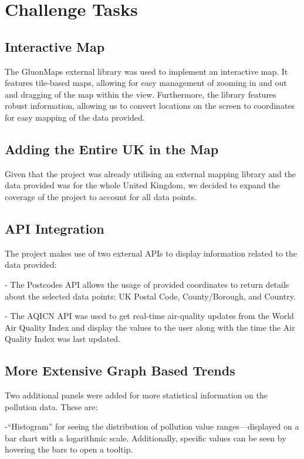 \documentclass[../main.tex]{subfiles}
\begin{document}
\section{Challenge Tasks}

\subsection{Interactive Map}
The GluonMaps external library was used to implement an interactive map. It features tile-based maps, allowing for easy management of zooming in and out and dragging of the map within the view. Furthermore, the library features robust information, allowing us to convert locations on the screen to coordinates for easy mapping of the data provided.
    
\subsection{Adding the Entire UK in the Map}
Given that the project was already utilising an external mapping library and the data provided was for the whole United Kingdom, we decided to expand the coverage of the project to account for all data points.
    
\subsection{API Integration}
The project makes use of two external APIs to display information related to the data provided:
    
    - The Postcodes API allows the usage of provided coordinates to return details about the selected data points: UK Postal Code, County/Borough, and Country. 
    
    - The AQICN API was used to get real-time air-quality updates from the World Air Quality Index and display the values to the user along with the time the Air Quality Index was last updated.
    
\subsection{More Extensive Graph Based Trends}
Two additional panels were added for more statistical information on the pollution data. These are:

    -“Histogram” for seeing the distribution of pollution value ranges—displayed on a bar chart with a logarithmic scale. Additionally, specific values can be seen by hovering the bars to open a tooltip.
    
\end{document}
